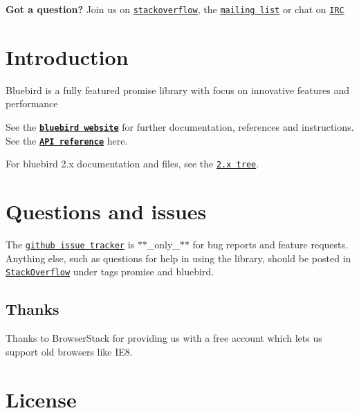\href{http://promisesaplus.com/}{\tt }

\href{https://travis-ci.org/petkaantonov/bluebird}{\tt } \href{http://petkaantonov.github.io/bluebird/coverage/debug/index.html}{\tt }

{\bfseries Got a question?} Join us on \href{http://stackoverflow.com/questions/tagged/bluebird}{\tt stackoverflow}, the \href{https://groups.google.com/forum/#!forum/bluebird-js}{\tt mailing list} or chat on \href{https://webchat.freenode.net/?channels=#promises}{\tt I\+RC}

\section*{Introduction}

Bluebird is a fully featured promise library with focus on innovative features and performance

See the \href{http://bluebirdjs.com/docs/getting-started.html}{\tt {\bfseries bluebird website}} for further documentation, references and instructions. See the \href{http://bluebirdjs.com/docs/api-reference.html}{\tt {\bfseries A\+PI reference}} here.

For bluebird 2.\+x documentation and files, see the \href{https://github.com/petkaantonov/bluebird/tree/2.x}{\tt 2.\+x tree}.

\section*{Questions and issues}

The \href{https://github.com/petkaantonov/bluebird/issues}{\tt github issue tracker} is $\ast$$\ast$\+\_\+only\+\_\+$\ast$$\ast$ for bug reports and feature requests. Anything else, such as questions for help in using the library, should be posted in \href{http://stackoverflow.com/questions/tagged/bluebird}{\tt Stack\+Overflow} under tags {\ttfamily promise} and {\ttfamily bluebird}.

\subsection*{Thanks}

Thanks to Browser\+Stack for providing us with a free account which lets us support old browsers like I\+E8.

\section*{License}

